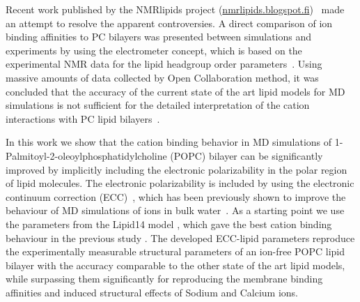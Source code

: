 \documentclass[aip,jcp,twocolumn]{revtex4}
\begin{document}
Recent work published by the NMRlipids project (\url{nmrlipids.blogspot.fi})~\cite{catte16}
made an attempt to resolve the apparent controversies. A direct comparison of
ion binding affinities to PC bilayers was presented between simulations and
experiments by using the electrometer concept, which is based on the experimental NMR data
for the lipid headgroup order parameters~\cite{seelig87}.
Using massive amounts of data collected by Open Collaboration method, it was concluded
that the accuracy of the current state of the art lipid models for MD
simulations is not sufficient for the detailed interpretation of the cation
interactions with PC lipid bilayers~\cite{catte16}.




In this work we show that the cation binding behavior
in MD simulations of 1-Palmitoyl-2-oleoylphosphatidylcholine (POPC) bilayer can be significantly 
improved by implicitly including the electronic polarizability
in the polar region of lipid molecules. The electronic
polarizability is included by using the electronic
continuum correction (ECC)~\cite{leontyev11}, which
has been previously shown to improve the behaviour of
MD simulations of ions in bulk water~\cite{jungwirth17-new-paper-to-be-published,Pluharova2014,kohagen14,kohagen16}. 
As a starting point we use the parameters from the Lipid14 model \cite{dickson14},
which gave the best cation binding behaviour in the previous study \cite{catte16}.
The developed ECC-lipid parameters reproduce the experimentally
measurable structural parameters of an ion-free POPC lipid bilayer with the 
accuracy comparable to the other state of the art lipid models, while surpassing
them significantly for reproducing the membrane binding affinities and induced
structural effects of Sodium and Calcium ions.


\end{document}
